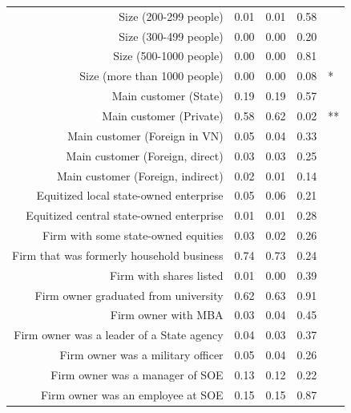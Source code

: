 \documentclass{beamer}
\begin{document}
\begin{frame}
\begin{columns}[T]
\begin{column}{.48\textwidth}
{{\begin{tabular}{rrrrl}
  Size (200-299 people) & 0.01 & 0.01 & 0.58 &  \\ 
  Size (300-499 people) & 0.00 & 0.00 & 0.20 &  \\ 
  Size (500-1000 people) & 0.00 & 0.00 & 0.81 &  \\ 
  Size (more than 1000 people) & 0.00 & 0.00 & 0.08 & * \\ 
  Main customer (State) & 0.19 & 0.19 & 0.57 &  \\ 
  Main customer (Private) & 0.58 & 0.62 & 0.02 & ** \\ 
  Main customer (Foreign in VN) & 0.05 & 0.04 & 0.33 &  \\ 
  Main customer (Foreign, direct) & 0.03 & 0.03 & 0.25 &  \\ 
  Main customer (Foreign, indirect) & 0.02 & 0.01 & 0.14 &  \\ 
  Equitized local state-owned enterprise & 0.05 & 0.06 & 0.21 &  \\ 
  Equitized central state-owned enterprise & 0.01 & 0.01 & 0.28 &  \\ 
  Firm with some state-owned equities & 0.03 & 0.02 & 0.26 &  \\ 
  Firm that was formerly household business & 0.74 & 0.73 & 0.24 &  \\ 
  Firm with shares listed & 0.01 & 0.00 & 0.39 &  \\ 
  Firm owner graduated from university & 0.62 & 0.63 & 0.91 &  \\ 
  Firm owner with MBA & 0.03 & 0.04 & 0.45 &  \\ 
  Firm owner was a leader of a State agency & 0.04 & 0.03 & 0.37 &  \\ 
  Firm owner was a military officer & 0.05 & 0.04 & 0.26 &  \\ 
  Firm owner was a manager of SOE & 0.13 & 0.12 & 0.22 &  \\ 
  Firm owner was an employee at SOE & 0.15 & 0.15 & 0.87 &  \\ 
   \hline
\end{tabular}       
}}
\end{column}%
\begin{column}{.48\textwidth}
\end{column}
\end{columns}
\end{frame}
\end{document}
